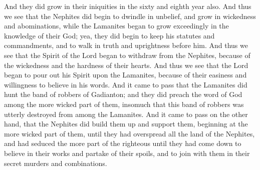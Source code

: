\bverse \iffalse And they did grow in their iniquities in the sixty and eighth year also. \fi
And they did grow in their iniquities in the sixty and eighth year also.
\bverse \iffalse And thus we see that the Nephites did begin to dwindle in unbelief, and grow in wickedness and abominations, while the Lamanites began to grow exceedingly in the knowledge of their God; yea, they did begin to keep his statutes and commandments, and to walk in truth and uprightness before him. \fi
And thus we see that the Nephites did begin to dwindle in unbelief, and grow in wickedness and abominations, while the Lamanites began to grow exceedingly in the knowledge of their God; yea, they did begin to keep his statutes and commandments, and to walk in truth and uprightness before him.
\bverse \iffalse And thus we see that the Spirit of the Lord began to withdraw from the Nephites, because of the wickedness and the hardness of their hearts. \fi
And thus we see that the Spirit of the Lord began to withdraw from the Nephites, because of the wickedness and the hardness of their hearts.
\bverse \iffalse And thus we see that the Lord began to pour out his Spirit upon the Lamanites, because of their easiness and willingness to believe in his words. \fi
And thus we see that the Lord began to pour out his Spirit upon the Lamanites, because of their easiness and willingness to believe in his words.
\bverse \iffalse And it came to pass that the Lamanites did hunt the band of robbers of Gadianton; and they did preach the word of God among the more wicked part of them, insomuch that this band of robbers was utterly destroyed from among the Lamanites. \fi
And it came to pass that the Lamanites did hunt the band of robbers of Gadianton; and they did preach the word of God among the more wicked part of them, insomuch that this band of robbers was utterly destroyed from among the Lamanites.
\bverse \iffalse And it came to pass on the other hand, that the Nephites did build them up and support them, beginning at the more wicked part of them, until they had overspread all the land of the Nephites, and had seduced the more part of the righteous until they had come down to believe in their works and partake of their spoils, and to join with them in their secret murders and combinations. \fi
And it came to pass on the other hand, that the Nephites did build them up and support them, beginning at the more wicked part of them, until they had overspread all the land of the Nephites, and had seduced the more part of the righteous until they had come down to believe in their works and partake of their spoils, and to join with them in their secret murders and combinations.
